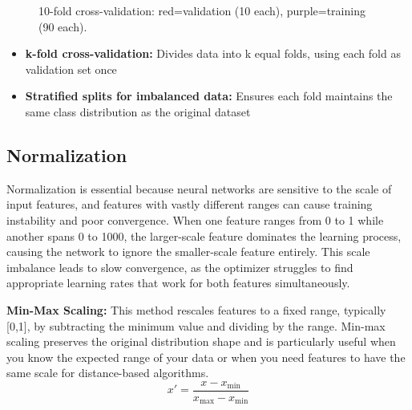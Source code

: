 \begin{figure}[h]
  \caption{10-fold cross-validation: red=validation (10 each), purple=training (90 each).}
  \label{fig:kfold-cv}
\end{figure}

\begin{itemize}
    \item \textbf{k-fold cross-validation:} Divides data into k equal folds, using each fold as validation set once
    \item \textbf{Stratified splits for imbalanced data:} Ensures each fold maintains the same class distribution as the original dataset
\end{itemize}


\subsection{Normalization}

Normalization is essential because neural networks are sensitive to the scale of input features, and features with vastly different ranges can cause training instability and poor convergence. When one feature ranges from 0 to 1 while another spans 0 to 1000, the larger-scale feature dominates the learning process, causing the network to ignore the smaller-scale feature entirely. This scale imbalance leads to slow convergence, as the optimizer struggles to find appropriate learning rates that work for both features simultaneously.

\textbf{Min-Max Scaling:} This method rescales features to a fixed range, typically [0,1], by subtracting the minimum value and dividing by the range. Min-max scaling preserves the original distribution shape and is particularly useful when you know the expected range of your data or when you need features to have the same scale for distance-based algorithms.
\begin{equation}
x' = \frac{x - x_{\min}}{x_{\max} - x_{\min}}
\end{equation}

